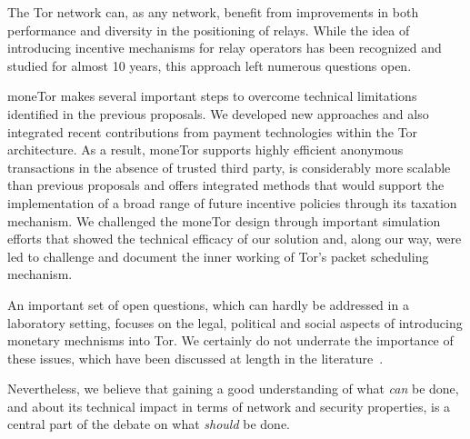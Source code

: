 
The Tor network can, as any network, benefit from improvements in both
performance and diversity in the positioning of relays. While the idea of
introducing incentive mechanisms for relay operators has been recognized and
studied for almost 10 years, this approach left numerous questions open.

moneTor makes several important steps to overcome technical limitations
identified in the previous proposals. We developed new approaches and also
integrated recent contributions from payment technologies within the Tor
architecture. As a result, moneTor supports highly efficient anonymous
transactions in the absence of trusted third party, is considerably more
scalable than previous proposals and offers integrated methods that would
support the implementation of a broad range of future incentive policies through
its taxation mechanism. We challenged the moneTor design through important
simulation efforts that showed the technical efficacy of our solution and, along
our way, were led to challenge and document the inner working of Tor's packet
scheduling mechanism.

An important set of open questions, which can hardly be addressed in a
laboratory setting, focuses on the legal, political and social aspects of
introducing monetary mechnisms into Tor. We certainly do not underrate the
importance of these issues, which have been discussed at length in the
literature~\cite{jansenblogpost}.

Nevertheless, we believe that gaining a good understanding of what \emph{can} be
done, and about its technical impact in terms of network and security
properties, is a central part of the debate on what \emph{should} be done.




